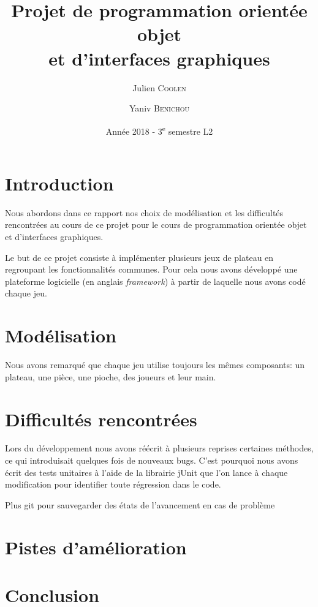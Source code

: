 \documentclass[a4paper, 11pt, DIV=9]{scrartcl}
\title{Projet de programmation orientée objet \\ et d'interfaces graphiques}
\author{Julien \textsc{Coolen} \and Yaniv \textsc{Benichou}}
\date{Année 2018 - 3\textsuperscript{e} semestre L2}
\begin{document}
\maketitle

\section{Introduction}

Nous abordons dans ce rapport nos choix de modélisation et
les difficultés rencontrées au cours de ce projet pour le cours de
programmation orientée objet et d’interfaces graphiques.

Le but de ce projet consiste à implémenter plusieurs jeux de
plateau en regroupant les fonctionnalités communes. Pour cela
nous avons développé une plateforme logicielle (en anglais \textit{framework}) à partir
de laquelle nous avons codé chaque jeu.


\section{Modélisation}

Nous avons remarqué que chaque jeu utilise toujours les mêmes composants:
un plateau, une pièce, une pioche, des joueurs et leur main.

\section{Difficultés rencontrées}


Lors du développement nous avons réécrit à plusieurs reprises certaines
méthodes, ce qui introduisait quelques fois de nouveaux bugs. C'est pourquoi
nous avons écrit des tests unitaires à l'aide de la librairie jUnit que l'on lance à
chaque modification pour identifier toute régression dans le code.

Plus git pour sauvegarder des états de l'avancement en cas de problème
\section{Pistes d'amélioration}
\section{Conclusion}
\end{document}
